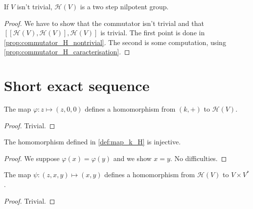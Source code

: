 \begin{theorem}
    \label{thm:two_step_nil}
    \leanok

    If $V$ isn't trivial, $\mathcal{H}(V)$ is a two step nilpotent group.
\end{theorem}
\begin{proof}
    \leanok
    We have to show that the commutator isn't trivial and that $[[\mathcal{H}(V),\mathcal{H}(V)],\mathcal{H}(V)]$
    is trivial. The first point is done in \ref{prop:commutator_H_nontrivial}.
    The second is some computation, using \ref{prop:commutator_H_caracterisation}.
\end{proof}

\section{Short exact sequence}

\begin{definition}
    \label{def:map_k_H}
    \leanok 

    The map $\varphi:z\mapsto (z,0,0)$ defines a homomorphism from
    $(k,+)$ to $\mathcal{H}(V)$.
    \begin{proof}
        \leanok
        Trivial.
    \end{proof}
\end{definition}

\begin{proposition}
    \label{prop:inj_map_k_H}
    \leanok 

    The homomorphism defined in \ref{def:map_k_H} is injective.
\end{proposition}
\begin{proof}
    \leanok
    We suppose $\varphi(x)=\varphi(y)$ and we show $x=y$. No difficulties.
\end{proof}

\begin{definition}
    \label{def:map_H_VxDual}
    \leanok 

    The map $\psi:(z,x,y)\mapsto (x,y)$ defines a homomorphism from 
    $\mathcal{H}(V)$ to $V\times V^*$.
    \begin{proof}
        \leanok
        Trivial.
    \end{proof}
\end{definition}

